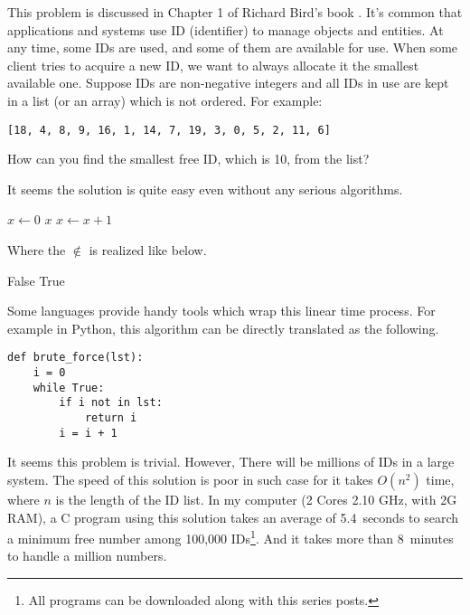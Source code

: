 \documentclass{article}
\begin{document}
This problem is discussed in Chapter 1 of Richard Bird's book \cite{Bird-book}.
It's common that applications and systems use ID (identifier)
to manage objects and entities. At any time, some IDs are used, and
some of them are available for use. When some client tries to acquire
a new ID, we want to always allocate it the smallest available one.
Suppose IDs are non-negative integers and all IDs in use are kept
in a list (or an array) which is not ordered. For example:

\begin{verbatim}
[18, 4, 8, 9, 16, 1, 14, 7, 19, 3, 0, 5, 2, 11, 6]
\end{verbatim}

How can you find the smallest free ID, which is 10, from the list?

It seems the solution is quite easy even without any serious algorithms.

\begin{algorithmic}[1]
  \State $x \gets 0$
  \Loop
      \State \Return $x$
    \Else
      \State $x \gets x + 1$
    \EndIf
  \EndLoop
\EndFunction
\end{algorithmic}

Where the $\notin$ is realized like below.

\begin{algorithmic}[1]
      \State \Return False
    \EndIf
  \EndFor
  \State \Return True
\EndFunction
\end{algorithmic}

Some languages provide handy tools which wrap this linear time
process. For example in Python, this algorithm can be directly translated
as the following.

\lstset{language=Python}
\begin{lstlisting}
def brute_force(lst):
    i = 0
    while True:
        if i not in lst:
            return i
        i = i + 1
\end{lstlisting}

It seems this problem is trivial. However, There will be millions of
IDs in a large system. The speed of this solution is poor in such case for
it takes $O(n^2)$ time, where $n$ is the length of the ID list.
In my computer (2 Cores 2.10 GHz, with 2G RAM), a C program using this
solution takes an average of 5.4~seconds to search a minimum free number
among 100,000 IDs\footnote{All programs can be downloaded along
with this series posts.}. And it takes more than 8~minutes to handle
a million numbers.
\end{document}

